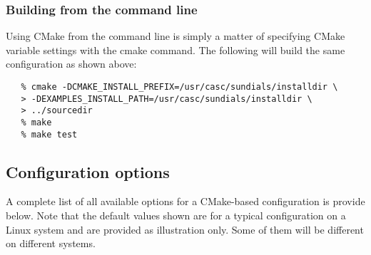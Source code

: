 \subsubsection*{Building from the command line}

Using CMake from the command line is simply a matter of specifying CMake variable settings
with the {\id cmake} command.  The following will build the same configuration as shown above:  

\begin{verbatim}
   % cmake -DCMAKE_INSTALL_PREFIX=/usr/casc/sundials/installdir \
   > -DEXAMPLES_INSTALL_PATH=/usr/casc/sundials/installdir \
   > ../sourcedir
   % make
   % make test
\end{verbatim}


\subsection{Configuration options}

A complete list of all available options for a CMake-based {\sundials}
configuration is provide below. Note that the default values shown are for 
a typical configuration on a Linux system and are provided as illustration only.
Some of them will be different on different systems.

